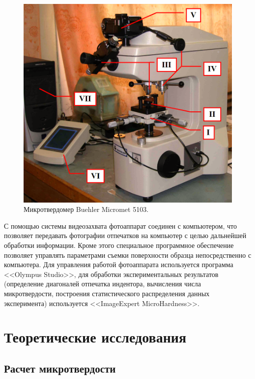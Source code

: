 \documentclass[12pt, a4paper]{article}
\begin{document}
    \begin{figure}[h]
        \centering
        \includegraphics[width = 14cm]{image_1.png}
        \caption{Микротвердомер Buehler Micromet 5103.}
        \label{im1}
    \end{figure}
    
    С помощью системы видеозахвата фотоаппарат соединен с компьютером, что позволяет передавать фотографии отпечатков на компьютер с целью дальнейшей обработки информации. Кроме этого специальное программное обеспечение позволяет управлять параметрами съемки поверхности образца непосредственно с компьютера. Для управления работой фотоаппарата используется программа <<Olympus Studio>>, для обработки экспериментальных  результатов (определение диагоналей отпечатка индентора, вычисления числа микротвердости, построения статистического распределения данных эксперимента) используется <<ImageExpert MicroHardness>>.
    
    \newpage
    
    \section{Теоретические исследования}
    
    \subsection{Расчет микротвердости}
    
\end{document}
